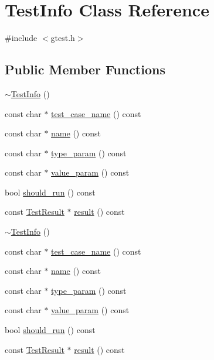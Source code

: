 \hypertarget{classtesting_1_1TestInfo}{\section{\-Test\-Info \-Class \-Reference}
\label{df/d65/classtesting_1_1TestInfo}
}


{\ttfamily \#include $<$gtest.\-h$>$}

\subsection*{\-Public \-Member \-Functions}
\begin{DoxyCompactItemize}
\item 
\hyperlink{classtesting_1_1TestInfo_aef4e5ab35d68c6c5b82d87246a1ec811}{$\sim$\-Test\-Info} ()
\item 
const char $\ast$ \hyperlink{classtesting_1_1TestInfo_a609cb6e3ffe274a79ede3c16fe92dc17}{test\-\_\-case\-\_\-name} () const 
\item 
const char $\ast$ \hyperlink{classtesting_1_1TestInfo_a862958aa3c2b9bf36903f1f0f2e81c54}{name} () const 
\item 
const char $\ast$ \hyperlink{classtesting_1_1TestInfo_ad596248661b2f4017c041425fa4c8b10}{type\-\_\-param} () const 
\item 
const char $\ast$ \hyperlink{classtesting_1_1TestInfo_a5751b0955ecccd6c6d9ab56d5150e60d}{value\-\_\-param} () const 
\item 
bool \hyperlink{classtesting_1_1TestInfo_ad82d0b35f1d10f27e8d03440f16ca467}{should\-\_\-run} () const 
\item 
const \hyperlink{classtesting_1_1TestResult}{\-Test\-Result} $\ast$ \hyperlink{classtesting_1_1TestInfo_a517e8e29c8151a283dfc4c9ddb8bed66}{result} () const 
\item 
\hyperlink{classtesting_1_1TestInfo_aef4e5ab35d68c6c5b82d87246a1ec811}{$\sim$\-Test\-Info} ()
\item 
const char $\ast$ \hyperlink{classtesting_1_1TestInfo_a609cb6e3ffe274a79ede3c16fe92dc17}{test\-\_\-case\-\_\-name} () const 
\item 
const char $\ast$ \hyperlink{classtesting_1_1TestInfo_a862958aa3c2b9bf36903f1f0f2e81c54}{name} () const 
\item 
const char $\ast$ \hyperlink{classtesting_1_1TestInfo_ad596248661b2f4017c041425fa4c8b10}{type\-\_\-param} () const 
\item 
const char $\ast$ \hyperlink{classtesting_1_1TestInfo_a5751b0955ecccd6c6d9ab56d5150e60d}{value\-\_\-param} () const 
\item 
bool \hyperlink{classtesting_1_1TestInfo_ad82d0b35f1d10f27e8d03440f16ca467}{should\-\_\-run} () const 
\item 
const \hyperlink{classtesting_1_1TestResult}{\-Test\-Result} $\ast$ \hyperlink{classtesting_1_1TestInfo_a517e8e29c8151a283dfc4c9ddb8bed66}{result} () const 
\end{DoxyCompactItemize}
